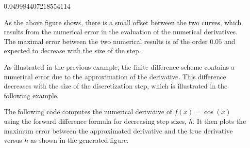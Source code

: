 0.049984407218554114

As the above figure shows, there is a small offset between the two curves, which results from the numerical error in the evaluation of the numerical derivatives. The maximal error between the two numerical results is of the order $0.05$ and expected to decrease with the size of the step.

As illustrated in the previous example, the finite difference scheme contains a numerical error due to the approximation of the derivative. This difference decreases with the size of the discretization step, which is illustrated in the following example.

\begin{example}
The following code computes the numerical derivative of $f(x)=\cos(x)$ using the forward difference formula for decreasing step sizes, $h$. It then plots the maximum error between the approximated derivative and the true derivative versus $h$ as shown in the generated figure.


\end{example}

